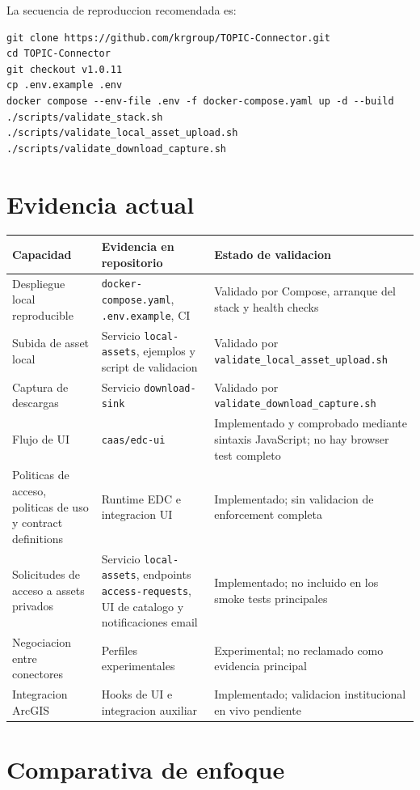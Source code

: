 \documentclass{article}
\begin{document}
La secuencia de reproduccion recomendada es:

\begin{verbatim}
git clone https://github.com/krgroup/TOPIC-Connector.git
cd TOPIC-Connector
git checkout v1.0.11
cp .env.example .env
docker compose --env-file .env -f docker-compose.yaml up -d --build
./scripts/validate_stack.sh
./scripts/validate_local_asset_upload.sh
./scripts/validate_download_capture.sh
\end{verbatim}

\section{Evidencia actual}

\begin{longtable}{|p{4.2cm}|p{5.2cm}|p{5.2cm}|}
\hline
\textbf{Capacidad} & \textbf{Evidencia en repositorio} & \textbf{Estado de validacion} \\
\hline
Despliegue local reproducible & \texttt{docker-compose.yaml}, \texttt{.env.example}, CI & Validado por Compose, arranque del stack y health checks \\
\hline
Subida de asset local & Servicio \texttt{local-assets}, ejemplos y script de validacion & Validado por \texttt{validate\_local\_asset\_upload.sh} \\
\hline
Captura de descargas & Servicio \texttt{download-sink} & Validado por \texttt{validate\_download\_capture.sh} \\
\hline
Flujo de UI & \texttt{caas/edc-ui} & Implementado y comprobado mediante sintaxis JavaScript; no hay browser test completo \\
\hline
Politicas de acceso, politicas de uso y contract definitions & Runtime EDC e integracion UI & Implementado; sin validacion de enforcement completa \\
\hline
Solicitudes de acceso a assets privados & Servicio \texttt{local-assets}, endpoints \texttt{access-requests}, UI de catalogo y notificaciones email & Implementado; no incluido en los smoke tests principales \\
\hline
Negociacion entre conectores & Perfiles experimentales & Experimental; no reclamado como evidencia principal \\
\hline
Integracion ArcGIS & Hooks de UI e integracion auxiliar & Implementado; validacion institucional en vivo pendiente \\
\hline
\end{longtable}

\section{Comparativa de enfoque}
\end{document}

